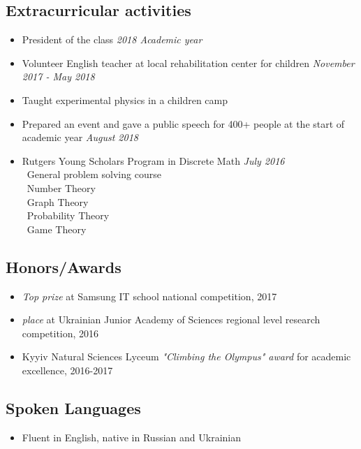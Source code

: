 \documentclass[letter,10pt]{extarticle}
\begin{document}
\subsection*{Extracurricular activities}
\vspace{-0.5em}
\begin{itemize}
    \item President of the class
    \hfill\emph{2018 Academic year}
    \vspace{-0.5em}
    \item Volunteer English teacher at local rehabilitation center for children
    \hfill\emph{November 2017 - May 2018}
    \vspace{-0.5em}
    \item Taught experimental physics in a children camp
    \vspace{-0.5em}
    \item Prepared an event and gave a public speech for 400+ people at the start of academic year
    \hfill\emph{August 2018}
    \vspace{-0.5em}
    \item Rutgers Young Scholars Program in Discrete Math
    \hfill\emph{July 2016}\\
        \textendash\ General problem solving course\\
        \textendash\ Number Theory\\
        \textendash\ Graph Theory\\
        \textendash\ Probability Theory\\
        \textendash\ Game Theory
\end{itemize}
\vspace{-2em}
\subsection*{Honors/Awards}
\vspace{-0.5em}
\begin{itemize}
  \item{\textsl{Top prize} at Samsung IT school national competition, 2017}
  \vspace{-0.5em}
  \item{\textsl{ place} at Ukrainian Junior Academy of Sciences regional level research competition, 2016}
  \vspace{-0.5em}
  \item{Kyyiv Natural Sciences Lyceum \textsl{"Climbing the Olympus" award} for academic excellence, 2016-2017}
\end{itemize}
\vspace{-2em}
\subsection*{Spoken Languages}
\vspace{-0.5em}
\begin{itemize}
\item[]{Fluent in English, native in Russian and Ukrainian}
\end{itemize}
\end{document}
